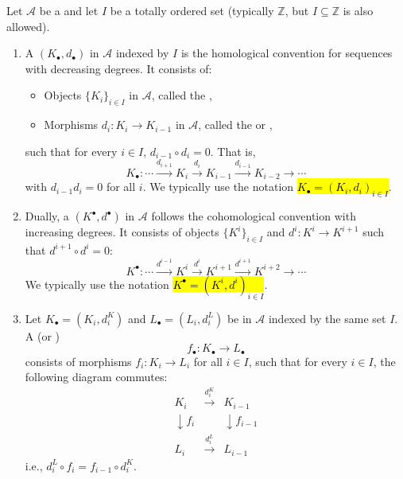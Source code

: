 \begin{definition} \label{definition:chain_complex_of_objects_in_an_additive_category}
Let $\mathcal{A}$ be a  and let $I$ be a totally ordered set (typically $\mathbb{Z}$, but $I \subseteq \mathbb{Z}$ is also allowed). 
\begin{enumerate}
    \item A  $(K_\bullet, d_\bullet)$ in $\mathcal{A}$ indexed by $I$ is the homological convention for sequences with decreasing degrees. It consists of:
    \begin{itemize}
        \item Objects $\{ K_i \}_{i \in I}$ in $\mathcal{A}$, called the ,
        \item Morphisms $d_i: K_i \to K_{i-1}$ in $\mathcal{A}$, called the  or ,
    \end{itemize}
    such that for every $i \in I$, $d_{i-1} \circ d_i = 0$. That is,
    $$ K_\bullet: \cdots \xrightarrow{d_{i+1}} K_i \xrightarrow{d_i} K_{i-1} \xrightarrow{d_{i-1}} K_{i-2} \xrightarrow{} \cdots $$
    with $d_{i-1}d_i = 0$ for all $i$. We typically use the notation \hl{$K_\bullet = (K_i, d_i)_{i \in I}$}.



    \item Dually, a  $(K^\bullet, d^\bullet)$ in $\mathcal{A}$ follows the cohomological convention with increasing degrees. It consists of objects $\{ K^i \}_{i \in I}$ and  $d^i: K^i \to K^{i+1}$ such that $d^{i+1} \circ d^i = 0$:
    $$ K^\bullet: \cdots \xrightarrow{d^{i-1}} K^i \xrightarrow{d^i} K^{i+1} \xrightarrow{d^{i+1}} K^{i+2} \xrightarrow{} \cdots $$
    We typically use the notation \hl{$K^\bullet = (K^i, d^i)_{i \in I}$}.

    \item Let $K_\bullet = (K_i, d_i^K)$ and $L_\bullet = (L_i, d_i^L)$ be  in $\mathcal{A}$ indexed by the same set $I$. A  (or )
    $$ f_\bullet: K_\bullet \to L_\bullet $$
    consists of morphisms $f_i: K_i \to L_i$ for all $i \in I$, such that for every $i \in I$, the following diagram commutes:
    $$ \begin{array}{ccc} K_i & \xrightarrow{d_i^K} & K_{i-1} \\ \downarrow{f_i} && \downarrow{f_{i-1}} \\ L_i & \xrightarrow{d_i^L} & L_{i-1} \end{array} $$
    i.e., $d_i^L \circ f_i = f_{i-1} \circ d_i^K$. 




\end{enumerate}
\end{definition}
